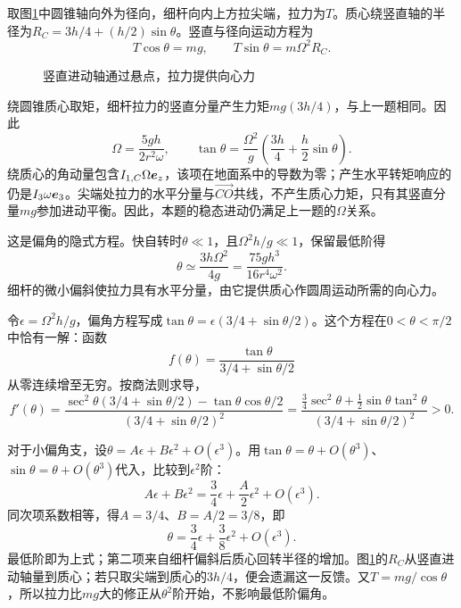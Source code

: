 \begin{solution}
取图\ref{fig:hw6-6-s}中圆锥轴向外为径向，细杆向内上方拉尖端，拉力为$T$。质心绕竖直轴的半径为$R_C=3h/4+(h/2)\sin\theta$。竖直与径向运动方程为
\[
 T\cos\theta=mg,\qquad T\sin\theta=m\Omega^2R_C.
\]

\begin{figure}[H]\centering
{}
\caption{竖直进动轴通过悬点，拉力提供向心力}\label{fig:hw6-6-s}
\end{figure}

绕圆锥质心取矩，细杆拉力的竖直分量产生力矩$mg(3h/4)$，与上一题相同。因此
\[
 \boxed{\Omega=\frac{5gh}{2r^2\omega},\qquad
 \tan\theta=\frac{\Omega^2}{g}
 \left(\frac{3h}{4}+\frac h2\sin\theta\right)}.
\]
绕质心的角动量包含$I_{1,C}\Omega\bm{e}_z$，该项在地面系中的导数为零；产生水平转矩响应的仍是$I_3\omega\bm{e}_3$。尖端处拉力的水平分量与$\overrightarrow{CO}$共线，不产生质心力矩，只有其竖直分量$mg$参加进动平衡。因此，本题的稳态进动仍满足上一题的$\Omega$关系。

这是偏角的隐式方程。快自转时$\theta\ll1$，且$\Omega^2h/g\ll1$，保留最低阶得
\[
 \boxed{\theta\simeq\frac{3h\Omega^2}{4g}
 =\frac{75gh^3}{16r^4\omega^2}}.
\]
细杆的微小偏斜使拉力具有水平分量，由它提供质心作圆周运动所需的向心力。


令$\epsilon=\Omega^2h/g$，偏角方程写成$\tan\theta=\epsilon(3/4+\sin\theta/2)$。这个方程在$0<\theta<\pi/2$中恰有一解：函数
\[
f(\theta)=\frac{\tan\theta}{3/4+\sin\theta/2}
\]
从零连续增至无穷。按商法则求导，
\[
f'(\theta)=\frac{\sec^2\theta(3/4+\sin\theta/2)-\tan\theta\cos\theta/2}
{(3/4+\sin\theta/2)^2}
=\frac{\tfrac34\sec^2\theta+\tfrac12\sin\theta\tan^2\theta}
{(3/4+\sin\theta/2)^2}>0.
\]

对于小偏角支，设$\theta=A\epsilon+B\epsilon^2+O(\epsilon^3)$。用$\tan\theta=\theta+O(\theta^3)$、$\sin\theta=\theta+O(\theta^3)$代入，比较到$\epsilon^2$阶：
\[
A\epsilon+B\epsilon^2
=\frac34\epsilon+\frac A2\epsilon^2+O(\epsilon^3).
\]
同次项系数相等，得$A=3/4$、$B=A/2=3/8$，即
\[
 \theta=\frac34\epsilon+\frac38\epsilon^2+O(\epsilon^3).
\]
最低阶即为上式；第二项来自细杆偏斜后质心回转半径的增加。图\ref{fig:hw6-6-s}的$R_C$从竖直进动轴量到质心；若只取尖端到质心的$3h/4$，便会遗漏这一反馈。又$T=mg/\cos\theta$，所以拉力比$mg$大的修正从$\theta^2$阶开始，不影响最低阶偏角。

\end{solution}



